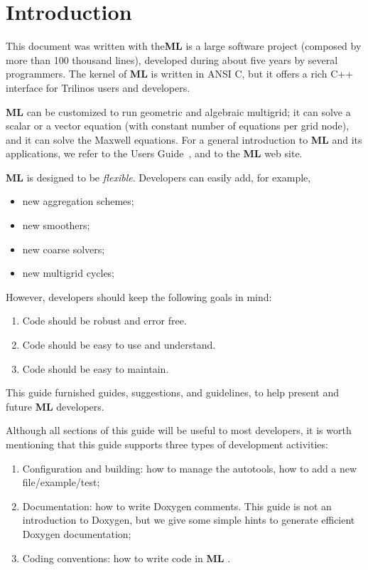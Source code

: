 \documentclass[10pt,letter,relax]{SANDreport}
\newcommand{\ML}     {{\bf ML }}
\begin{document}
\clearpage
\newpage


\section{Introduction}

This document was written with the\ML is a large software project (composed by more than 100 thousand
lines), developed during about five years by several programmers. The
kernel of \ML is written in ANSI C, but it offers a rich C++ interface
for Trilinos users and developers. 

\ML can be customized to run geometric and algebraic multigrid; it can
solve a scalar or a vector equation (with constant number of equations
per grid node), and it can solve the Maxwell equations. For a general
introduction to \ML and its applications, we refer to the Users
Guide~\cite{ml_users_guide}, and to the \ML web site. 

\ML is designed to be {\sl flexible}. Developers can easily add, for example,
\begin{itemize}
\item new aggregation schemes;
\item new smoothers;
\item new coarse solvers;
\item new multigrid cycles;
\end{itemize}
However, developers should keep the following goals in mind:
\begin{enumerate}
\item Code should be robust and error free.
\item Code should be easy to use and understand.
\item Code should be easy to maintain.
\end{enumerate}
This guide furnished guides, suggestions, and guidelines, to help present and
future \ML developers. 

Although all sections of this guide will be useful to most developers,
it is worth mentioning that this guide supports three types of
development activities:
\begin{enumerate}
\item Configuration and building: how to manage the autotools, how to
  add a new file/example/test;
\item Documentation: how to write Doxygen comments. This guide is not an
  introduction to Doxygen, but we give some simple hints to generate
  efficient Doxygen documentation;
\item Coding conventions: how to write code in \ML.
\end{enumerate}
\end{document}

